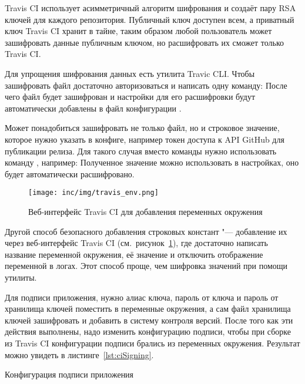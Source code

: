 Travis CI использует асимметричный алгоритм шифрования и создаёт пару RSA ключей для каждого репозитория.
Публичный ключ доступен всем, а приватный ключ Travis CI хранит в тайне, таким образом любой пользователь может зашифровать данные публичным ключом, но расшифровать их сможет только Travis CI\@.

Для упрощения шифрования данных есть утилита Travic CLI\@.
Чтобы зашифровать файл достаточно авторизоваться и написать одну команду:
После чего файл будет зашифрован и настройки для его расшифровки будут автоматически добавлены в файл конфигурации .

Может понадобиться зашифровать не только файл, но и строковое значение, которое нужно указать в конфиге, например токен доступа к API GitHub для публикации релиза.
Для такого случая вместо команды  нужно использовать команду , например:
Полученное значение можно использовать в настройках, оно будет автоматически расшифровано.

\begin{figure}[ht]
  \centering
  \texttt{[image: inc/img/travis\_env.png]}
  \caption{Веб-интерфейс Travis CI для добавления переменных окружения}
  \label{fig:travisEnv}
\end{figure}

Другой способ безопасного добавления строковых констант "--- добавление их через веб-интерфейс Travis CI (см.~рисунок~\ref{fig:travisEnv}), где достаточно написать название переменной окружения, её значение и отключить отображение переменной в логах.
Этот способ проще, чем шифровка значений при помощи утилиты.

Для подписи приложения, нужно алиас ключа, пароль от ключа и пароль от хранилища ключей поместить в переменные окружения, а сам файл хранилища ключей зашифровать и добавить в систему контроля версий.
После того как эти действия выполнены, надо изменить конфигурацию подписи, чтобы при сборке из Travis CI конфигурации подписи брались из переменных окружения.
Результат можно увидеть в листинге~\ref{lst:ciSigning}.

\begin{listing}[h]
  \caption{Конфигурация подписи приложения}
  \label{lst:ciSigning}
\end{listing}

